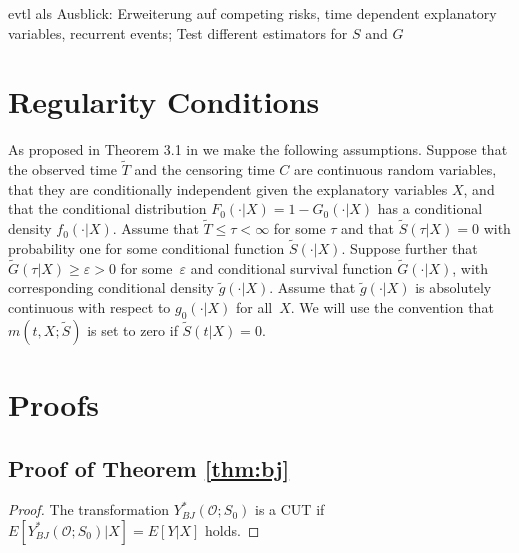 \documentclass[12pt, a4paper]{scrartcl}
\theoremstyle{definition}
\theoremstyle{plain}
\numberwithin{equation}{section}
\numberwithin{figure}{section}
\numberwithin{table}{section}
\begin{document}
	evtl als Ausblick: Erweiterung auf competing risks, time dependent explanatory variables, recurrent events; Test different estimators for $S$ and $G$
	
	\newpage
	
	\thispagestyle{empty}
	
	
	
	\newpage
	
	\begin{appendices}
		\section{Regularity Conditions}\label{regcond}
		As proposed in Theorem 3.1 in \citet*{drcut} we make the following assumptions.
		Suppose that the observed time $\tilde T$ and the censoring time $C$ are continuous random variables, that they are conditionally independent given the explanatory variables $X$, and that the conditional distribution $F_0(\cdot \vert X) = 1 - G_0(\cdot \vert X)$ has a conditional density $f_0(\cdot \vert X)$.
		Assume that $\tilde T \leq \tau < \infty$ for some $\tau$ and that $\tilde{S}(\tau \vert X)=0$ with probability one for some conditional function $\tilde{S}(\cdot \vert X)$.
		Suppose further that $\tilde{G}(\tau \vert X)\geq \varepsilon > 0$ for some~$\varepsilon$ and conditional survival function $\tilde{G}(\cdot \vert X)$, with corresponding conditional density $\tilde{g}(\cdot\vert X)$.
		Assume that $\tilde{g}(\cdot\vert X)$ is absolutely continuous with respect to $g_0(\cdot\vert X)$ for all~$X$.
		We will use the convention that $m(t,X;\tilde{S})$ is set to zero if $\tilde{S}(t \vert X)=0$.
		\section{Proofs}
		\subsection{Proof of Theorem \ref{thm:bj}}\label{proof:bjcut}
		\begin{proof}
			The transformation $Y_{BJ}^*(\mathcal{O}; S_0)$ is a CUT if $E[Y_{BJ}^*(\mathcal{O}; S_0)\vert X] = E[Y\vert X]$ holds.
			

\end{proof}
\end{appendices}
\end{document}
